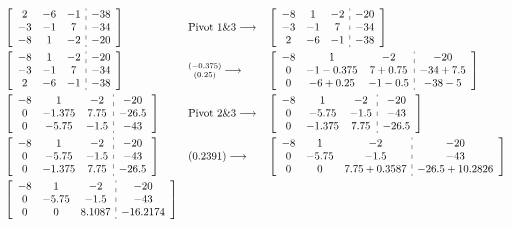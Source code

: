 \documentclass{article}
\begin{document}
\begin{align*}
&\left[ \begin{array}{ c c c : c }
2	&	-6	&	-1	&	-38	\\
-3	&	-1	&	7	&	-34	\\
-8	&	1	&	-2	&	-20
\end{array} \right]
&	
&\text{Pivot 1\&3}\longrightarrow
&
&\left[ \begin{array}{ c c c : c }
-8	&	1	&	-2	&	-20	\\
-3	&	-1	&	7	&	-34	\\
2	&	-6	&	-1	&	-38
\end{array} \right]
\\
&\left[ \begin{array}{ c c c : c }
-8	&	1	&	-2	&	-20	\\
-3	&	-1	&	7	&	-34	\\
2	&	-6	&	-1	&	-38
\end{array} \right]
&	
&\substack{(-0.375)\\(0.25)}\longrightarrow
&
&\left[ \begin{array}{ c c c : c }
-8	&	1			&	-2		&	-20		\\
0	&	-1-0.375	&	7+0.75	&	-34+7.5	\\
0	&	-6+0.25		&	-1-0.5	&	-38-5
\end{array} \right]
\\
&\left[ \begin{array}{ c c c : c }
-8	&	1		&	-2		&	-20		\\
0	&	-1.375	&	7.75	&	-26.5	\\
0	&	-5.75	&	-1.5	&	-43
\end{array} \right]
&	
&\text{Pivot 2\&3}\longrightarrow
&
&\left[ \begin{array}{ c c c : c }
-8	&	1		&	-2		&	-20		\\
0	&	-5.75	&	-1.5	&	-43		\\
0	&	-1.375	&	7.75	&	-26.5
\end{array} \right]
\\
&\left[ \begin{array}{ c c c : c }
-8	&	1		&	-2		&	-20		\\
0	&	-5.75	&	-1.5	&	-43		\\
0	&	-1.375	&	7.75	&	-26.5
\end{array} \right]
&	
&(0.2391)\longrightarrow
&
&\left[ \begin{array}{ c c c : c }
-8	&	1		&	-2			&	-20		\\
0	&	-5.75	&	-1.5		&	-43		\\
0	&	0		&	7.75+0.3587	&	-26.5+10.2826
\end{array} \right]
\\
&\left[ \begin{array}{ c c c : c }
-8	&	1		&	-2		&	-20		\\
0	&	-5.75	&	-1.5	&	-43		\\
0	&	0		&	8.1087	&	-16.2174
\end{array} \right]
\end{align*}
\end{document}
